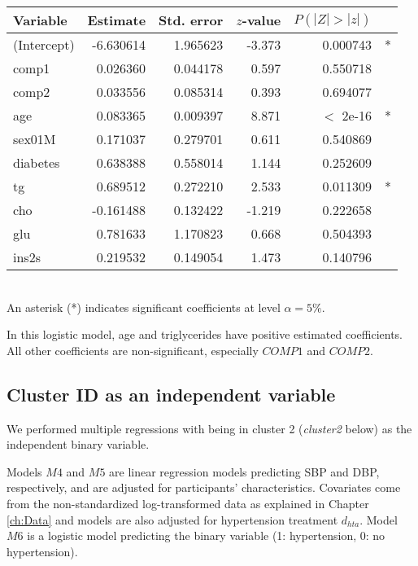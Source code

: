 \begin{table}
\centering
{}
\begin{tabular}{lrrrrl}
\toprule
Variable & Estimate & Std. error & $z$-value & $P(|Z|>|z|)$ &\\
\midrule
(Intercept)& -6.630614 &  1.965623 & -3.373 &0.000743& * \\
comp1      &  0.026360 &  0.044178  & 0.597& 0.550718   &  \\
comp2    &    0.033556&   0.085314   &0.393 &0.694077   &  \\
age     &     0.083365  & 0.009397 &  8.871  & $<$ 2e-16 &* \\
sex01M &      0.171037  & 0.279701&   0.611 &0.540869    & \\
diabetes  &   0.638388 &  0.558014 &  1.144& 0.252609  &   \\
tg         &  0.689512  & 0.272210  & 2.533 &0.011309& *  \\ 
cho     &    -0.161488   &0.132422  &-1.219 &0.222658    & \\
glu      &    0.781633 &  1.170823  & 0.668& 0.504393    & \\
ins2s     &   0.219532&  0.149054&   1.473& 0.140796& \\
\bottomrule
\end{tabular}
\label{table:betasm3} \\
{\footnotesize An asterisk (*) indicates significant coefficients at level $\alpha=5\%$.}
\end{table}

In this logistic model, age and triglycerides have positive estimated coefficients. All other coefficients are non-significant, especially $COMP1$ and $COMP2$.

\subsection{Cluster ID as an independent variable}
We performed multiple regressions with being in cluster 2 (\emph{cluster2} below) as the independent binary variable.

Models $M4$ and $M5$ are linear regression models predicting SBP and DBP, respectively, and are adjusted for participants' characteristics. Covariates come from the non-standardized log-transformed data as explained in Chapter \ref{ch:Data} and models are also adjusted for hypertension treatment $d_{hta}$. Model $M6$ is a logistic model predicting the binary variable (1: hypertension, 0: no hypertension).

